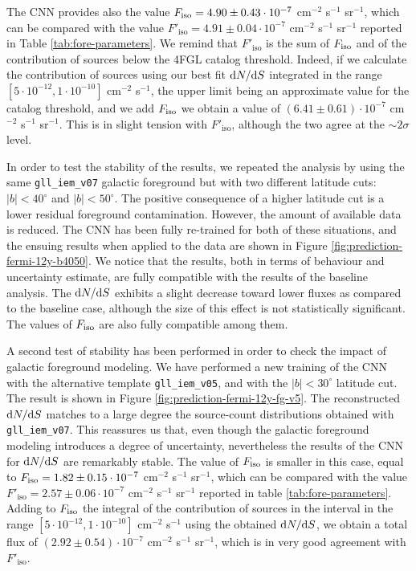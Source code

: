 The CNN provides also the value $F_{\text{iso}}=4.90 \pm 0.43 \cdot 10^{-7}$ cm$^{-2}$ s$^{-1}$ sr$^{-1}$, 
which can be compared with the value $F'_\textrm{iso}=4.91 \pm 0.04 \cdot 10^{-7}$ cm$^{-2}$ s$^{-1}$ sr$^{-1}$ reported in Table \ref{tab:fore-parameters}.
We remind that $F'_\textrm{iso}$ is the sum of $F_{\text{iso}}$ and of the contribution of sources below the 4FGL catalog threshold. Indeed, if we  calculate the contribution of sources using our best fit $\text{d}N/\text{d}S$ integrated in the range $[5 \cdot 10^{-12}, 1 \cdot 10^{-10}]$ cm$^{-2}$ s$^{-1}$, the upper limit being an approximate value for the catalog threshold, and we add $F_{\text{iso}}$  we obtain a value of {$(6.41 \pm 0.61)\cdot 10^{-7}$ cm$^{-2}$ s$^{-1}$} sr$^{-1}$.
This is in slight tension with $F'_\textrm{iso}$, although the two agree at the $\sim 2\sigma$ level.


In order to test the stability of the results, we repeated the analysis by using the same \verb|gll_iem_v07| galactic foreground but with two different latitude cuts: $|b|<40^\circ$ and $|b|<50^\circ$. The positive consequence of a higher latitude cut is a lower residual foreground contamination. However, the amount of available data is reduced. The CNN has been fully re-trained for both of these situations, and the ensuing results when applied to the \fermi data are shown in Figure \ref{fig:prediction-fermi-12y-b4050}. We notice that the results, both in terms of behaviour and uncertainty estimate, are fully compatible with the results of the baseline analysis. The $\text{d}N/\text{d}S$ exhibits a slight decrease toward lower fluxes as compared to the baseline case, although the size of this effect is not statistically significant. The values of $F_{\text{iso}}$ are also fully compatible among them.

A second test of stability has been performed in order to check the impact of galactic foreground modeling. We have performed a new training of the CNN with the alternative template \verb|gll_iem_v05|, and with the $|b|<30^\circ$ latitude cut. The result is shown in Figure \ref{fig:prediction-fermi-12y-fg-v5}. The reconstructed $\text{d}N/\text{d}S$ matches to a large degree the source-count distributions obtained with \verb|gll_iem_v07|. This reassures us that, even though the galactic foreground modeling introduces a degree of uncertainty, nevertheless the results of the CNN for $\text{d}N/\text{d}S$ are remarkably stable.
The value of $F_{\text{iso}}$ is smaller in this case, equal to
$F_{\text{iso}}=1.82 \pm 0.15 \cdot 10^{-7}$ cm$^{-2}$ s$^{-1}$ sr$^{-1}$, 
which can be compared with the value $F'_\textrm{iso}=2.57 \pm 0.06 \cdot 10^{-7}$ cm$^{-2}$ s$^{-1}$ sr$^{-1}$ reported in table \ref{tab:fore-parameters}.
Adding to $F_{\text{iso}}$ the integral of the contribution of sources in the interval in the range $[5 \cdot 10^{-12}, 1 \cdot 10^{-10}]$ cm$^{-2}$ s$^{-1}$ using the obtained $\text{d}N/\text{d}S$, we obtain a total flux of { $(2.92 \pm 0.54)\cdot 10^{-7}$ cm$^{-2}$ s$^{-1}$} sr$^{-1}$, which is in very good agreement with $F'_\textrm{iso}$. 






